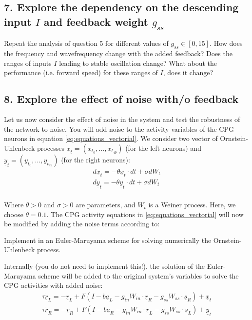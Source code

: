 \documentclass{cmc}
\begin{document}



\subsection*{7. Explore the dependency on the descending input $I$ and feedback weight $g_{ss}$}\label{sec:ex7}
Repeat the analysis of question 5 for different values of $g_{ss} \in \left[0,15 \right]$. How does the frequency and wavefrequency change with the added feedback? Does the ranges of inputs $I$ leading to stable oscillation change? What about the performance (i.e. forward speed) for these ranges of $I$, does it change?





\subsection*{8. Explore the effect of noise with/o feedback}\label{sec:ex8}
Let us now consider the effect of noise in the system and test the robustness of the network to noise. You will add noise to the activity variables of the CPG neurons in equation \ref{eq:equations_vectorial}. We consider two vector of Ornstein-Uhlenbeck processes $\underline{x}_t = (x_{t_0},...,x_{t_{49}})$ (for the left neurons) and $\underline{y}_t = (y_{t_0},...,y_{t_{49}})$ (for the right neurons):
\begin{equation}
    \begin{array}{lcl}
	d\underline{x}_t = - \theta \underline{x}_t \cdot dt + \sigma dW_t\\
	d\underline{y}_t = - \theta \underline{y}_t \cdot dt + \sigma dW_t\\
    \end{array}
	\label{eq:ou_process}
\end{equation}

Where $\theta>0$ and $\sigma>0$ are parameters, and $W_t$ is a Weiner process. Here, we choose $\theta=0.1$. The CPG activity equations in \ref{eq:equations_vectorial} will now be modified by adding the noise terms according to:

Implement in  an Euler-Maruyama scheme for solving numerically the Ornstein-Uhlenbeck process.

Internally (you do not need to implement this!), the solution of the Euler-Maruyama scheme will be added to the original system's variables to solve the CPG activities with added noise:
\begin{equation}
    \begin{array}{lcl}
	\tau \dot{\underline{r}}_{L} = -\underline{r}_L + F(I-b \underline{a}_L - g_{in} W_{in} \cdot \underline{r}_R - g_{ss} W_{ss} \cdot \underline{s}_R ) + \underline{x}_t\\
	\tau \dot{\underline{r}}_{R} = -\underline{r}_R + F(I-b \underline{a}_R - g_{in} W_{in} \cdot \underline{r}_L - g_{ss} W_{ss} \cdot \underline{s}_L ) + \underline{y}_t
    \end{array}
	\label{eq:noise_added_vectorial}
\end{equation}
\end{document}
